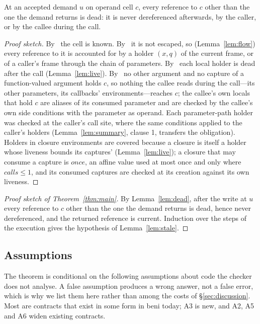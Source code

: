 \begin{lemma}
\label{lem:dead}
At an accepted demand $u$ on operand cell $c$, every reference to $c$ other than the one the demand
returns is dead: it is never dereferenced afterwards, by the caller, or by the callee during the call.
\end{lemma}
\begin{proof}[Proof sketch]
By \Known\ the cell is known. By \Unescaped\ it is not escaped, so (Lemma~\ref{lem:flow}) every
reference to it is accounted for by a holder $(x, q)$ of the current frame, or of a caller's frame
through the chain of parameters. By \Dead\ each local holder is dead after the call
(Lemma~\ref{lem:live}). By \Disjoint\ no other argument and no capture of a function-valued argument
holds $c$, so nothing the callee reads during the call---its other parameters, its callbacks'
environments---reaches $c$; the callee's own locals that hold $c$ are aliases of its consumed
parameter and are checked by the callee's own side conditions with the parameter as operand. Each
parameter-path holder was checked at the caller's call site, where the same conditions applied to the
caller's holders (Lemma~\ref{lem:summary}, clause 1, transfers the obligation). Holders in closure
environments are covered because a closure is itself a holder whose liveness bounds its captures'
(Lemma~\ref{lem:live}); a closure that may consume a capture is $\mathit{once}$, an affine value used
at most once and only where $\mathit{calls} \le 1$, and its consumed captures are checked at its
creation against its own liveness.
\end{proof}

\begin{proof}[Proof sketch of Theorem~\ref{thm:main}]
By Lemma~\ref{lem:dead}, after the write at $u$ every reference to $c$ other than the one the demand
returns is dead, hence never dereferenced, and the returned reference is current. Induction over the
steps of the execution gives the hypothesis of Lemma~\ref{lem:stale}.
\end{proof}

\subsection{Assumptions}
\label{sec:soundness-assumptions}

The theorem is conditional on the following assumptions about code the checker does not analyse. A
false assumption produces a wrong answer, not a false error, which is why we list them here rather
than among the costs of \S\ref{sec:discussion}. Most are contracts that exist in some form in beni
today; A3 is new, and A2, A5 and A6 widen existing contracts.

